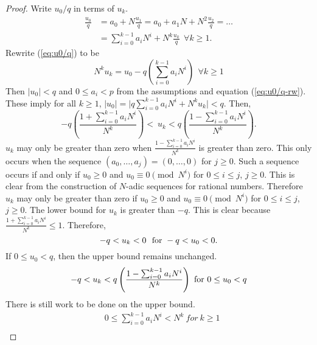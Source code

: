 \documentclass[english]{article}
\theoremstyle{plain}
\theoremstyle{definition}
\theoremstyle{remark}
\begin{document}
\begin{proof}
  Write $u_0/q$ in terms of $u_k$.
  {\allowdisplaybreaks
  \begin{align}
    \frac{u_0}{q} &= a_0 + N\frac{u_1}{q}
                     = a_0 + a_1N + N^2\frac{u_2}{q}
                     = \dots \nonumber \\
                  &= \sum_{i=0}^{k-1}a_iN^i + N^k\frac{u_k}{q} \ \ 
                    \forall k \geq 1. \label{eq:u0/q}
  \end{align}
  }
  Rewrite (\ref{eq:u0/q}) to be
  \begin{equation}\label{eq:u0/q-rw}
    N^ku_k=u_0-q\left(\sum_{i=0}^{k-1}a_iN^i\right) \ \ \forall k \geq 1
  \end{equation}
  Then $\lvert u_0 \rvert < q$ and $0 \leq a_i < p$ from the assumptions and
  equation (\ref{eq:u0/q-rw}). These imply for all $k \geq 1$,
  $\lvert u_0 \rvert = \lvert q\sum_{i=0}^{k-1}a_iN^i + N^ku_k \rvert < q$.
  Then,
  \begin{equation*}
    -q\left(\frac{1+\sum_{i=0}^{k-1}a_iN^i}{N^k}\right)
      < \ u_k
      < q\left(\frac{1-\sum_{i=0}^{k-1}a_iN^i}{N^k}\right).
  \end{equation*}
  $u_k$ may only be greater than zero when $\frac{1-\sum_{i=0}^{k-1}a_iN^i}
  {N^k}$ is greater than zero. This only occurs when the sequence
  $(a_0,\dots,a_j) = (0,\dots,0)$ for $j\geq0$. Such a sequence occurs if
  and only if $u_0\geq0$ and $u_0 \equiv 0 \pmod{N^i}$ for $0\leq i \leq j$,
  $j\geq0$. This is clear from the construction of $N$-adic sequences for
  rational numbers. Therefore $u_k$ may only be greater than zero if
  $u_0\geq0$ and $u_0 \equiv 0 \pmod{N^i}$ for $0\leq i \leq j$, $j\geq0$.
  The lower bound for $u_k$ is greater than $-q$. This is clear because
  $\frac{1+\sum_{i=0}^{k-1}a_iN^i}{N^k}\leq1$.
  Therefore,
  \begin{equation*}
    -q < u_k < 0 {\rm \ \ for \ } -q<u_0<0.
  \end{equation*}
  If $0\leq u_0<q$, then the upper bound remains unchanged.
  \begin{equation*}
    -q < u_k < q\left(\frac{1-\sum_{i=0}^{k-1}a_iN^i}{N^k}\right)
      \ {\rm for} \ 0\leq u_0 < q
  \end{equation*}
  There is still work to be done on the upper bound.
  \begin{align*}
                &0 \leq \sum_{i=0}^{k-1}a_iN^i < N^k \ for \ k\geq1 \\

\end{align*}
\end{proof}
\end{document}
